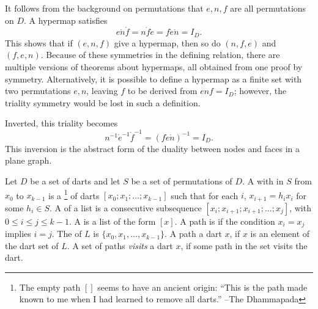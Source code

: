 \figZGPXAWJ %

It follows from the background on permutations that $e,n,f$ are all permutations on $D$.
A hypermap satisfies 
\begin{equation}\label{eqn:triality}
e \ocirc n\ocirc f = n\ocirc f\ocirc e = f\ocirc e\ocirc n = I_D.
\end{equation}
This  shows that if $(e,n,f)$ give a
hypermap, then so do $(n,f,e)$ and $(f,e,n)$.  Because of these
symmetries in the defining relation, there are multiple versions of
theorems about hypermaps, all obtained from one proof by symmetry.
Alternatively, it is possible to define a hypermap as a finite set
with two permutations $e,n$, leaving $f$ to be derived from $e n f =
I_D$; however, the triality symmetry would be lost in such a
definition.

Inverted, this triality becomes
\[ 
n^{-1} \ocirc e^{-1} \ocirc f^{-1} = (f \ocirc e \ocirc n)^{-1} = I_D.
\] 
This inversion is the abstract form of the duality between nodes
and faces in a plane graph. 


\begin{definition} 
   Let $D$ be a set of darts and let $S$ be
  a set of permutations of $D$.  A  with 
  in $S$ from $x_0$ to $x_{k-1}$ is a \footnote{The
    empty path $[]$ seems to have an ancient origin: ``This is the
    path made known to me when I had learned to remove all darts.''
    --The Dhammapada} of darts $[x_0;x_1;\ldots;x_{k-1}]$ such that
  for each $i$, $x_{i+1} = h_i x_i$ for some $h_i \in S$.  A
   of a list is a consecutive subsequence
  $[x_i;x_{i+1};x_{i+1};\ldots;x_j]$, with $0\le i\le j\le k-1$.  A
   is a list of the form $[x]$.  A path is
   if the condition $x_i=x_j$ implies $i=j$.  The
   of $L$ is $\{x_0,x_1,\ldots,x_{k-1}\}$.  A path
   a dart $x$, if $x$ is an element of the dart set of
  $L$.  A set of paths {\it visits} a dart $x$, if some path in the set
  visits the dart.
\end{definition}
%
%



